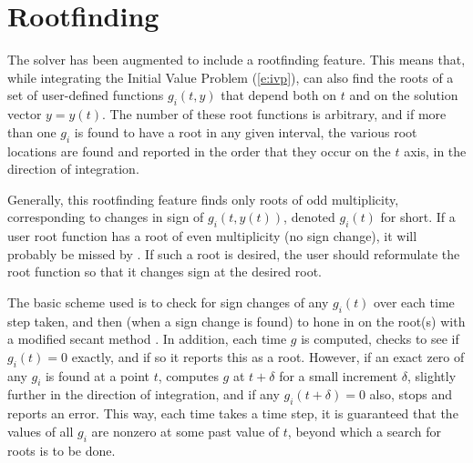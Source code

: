 \section{Rootfinding}\label{ss:rootfinding}

The {\cvodes} solver has been augmented to include a rootfinding
feature.  This means that, while integrating the Initial Value Problem
(\ref{e:ivp}), {\cvodes} can also find the roots of a set of user-defined
functions $g_i(t,y)$ that depend both on $t$ and on the solution vector 
$y = y(t)$.  The number of these root functions is arbitrary, and if
more than one $g_i$ is found to have a root in any given interval, the
various root locations are found and reported in the order that they
occur on the $t$ axis, in the direction of integration.

Generally, this rootfinding feature finds only roots of odd
multiplicity, corresponding to changes in sign of $g_i(t,y(t))$,
denoted $g_i(t)$ for short.  If a user root function has a root of
even multiplicity (no sign change), it will probably be missed by
{\cvodes}.  If such a root is desired, the user should reformulate the
root function so that it changes sign at the desired root.

The basic scheme used is to check for sign changes of any $g_i(t)$ over
each time step taken, and then (when a sign change is found) to hone
in on the root(s) with a modified secant method \cite{HeSh:80}.  
In addition, each time $g$ is computed, {\cvodes} checks to see if 
$g_i(t) = 0$ exactly, and if so it reports this as a root.  However,
if an exact zero of any $g_i$ is found at a point $t$, {\cvodes}
computes $g$ at $t + \delta$ for a small increment $\delta$, slightly
further in the direction of integration, and if any $g_i(t + \delta)=0$ 
also, {\cvodes} stops and reports an error.  This way, each time
{\cvodes} takes a time step, it is guaranteed that the values of all
$g_i$ are nonzero at some past value of $t$, beyond which a search for
roots is to be done.

